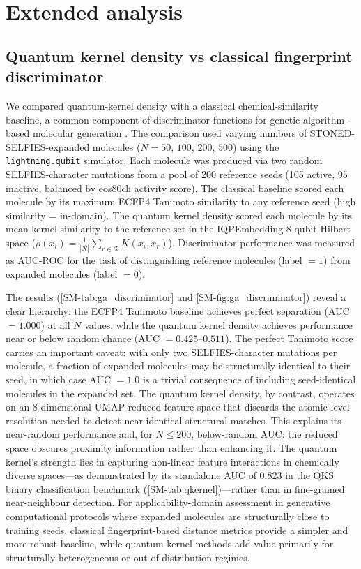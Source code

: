 \documentclass[11pt,a4paper]{article}
\begin{document}
\section{Extended analysis}

\subsection{Quantum kernel density vs classical fingerprint discriminator}


We compared quantum-kernel density with a classical chemical-similarity baseline, a common component of discriminator functions for genetic-algorithm-based molecular generation \citep{jensen2019augmenting}. The comparison used varying numbers of STONED-SELFIES-expanded molecules ($N = 50$, $100$, $200$, $500$) using the \texttt{lightning.qubit} simulator. Each molecule was produced via two random SELFIES-character mutations from a pool of \num{200} reference seeds (\num{105} active, \num{95} inactive, balanced by eos80ch activity score). The classical baseline scored each molecule by its maximum ECFP4 Tanimoto similarity to any reference seed (high similarity = in-domain). The quantum kernel density scored each molecule by its mean kernel similarity to the reference set in the IQPEmbedding 8-qubit Hilbert space ($\rho(x_i) = \frac{1}{|\mathcal{R}|}\sum_{r \in \mathcal{R}} K(x_i, x_r)$). Discriminator performance was measured as AUC-ROC for the task of distinguishing reference molecules (label $= 1$) from expanded molecules (label $= 0$).

The results (\cref{SM-tab:ga_discriminator} and \cref{SM-fig:ga_discriminator}) reveal a clear hierarchy: the ECFP4 Tanimoto baseline achieves perfect separation (AUC $= \num{1.000}$) at all $N$ values, while the quantum kernel density achieves performance near or below random chance (AUC $= \numrange{0.425}{0.511}$). The perfect Tanimoto score carries an important caveat: with only two SELFIES-character mutations per molecule, a fraction of expanded molecules may be structurally identical to their seed, in which case AUC $= \num{1.0}$ is a trivial consequence of including seed-identical molecules in the expanded set. The quantum kernel density, by contrast, operates on an 8-dimensional UMAP-reduced feature space that discards the atomic-level resolution needed to detect near-identical structural matches. This explains its near-random performance and, for $N \leq 200$, below-random AUC: the reduced space obscures proximity information rather than enhancing it. The quantum kernel's strength lies in capturing non-linear feature interactions in chemically diverse spaces---as demonstrated by its standalone AUC of \num{0.823} in the QKS binary classification benchmark (\cref{SM-tab:qkernel})---rather than in fine-grained near-neighbour detection. For applicability-domain assessment in generative computational protocols where expanded molecules are structurally close to training seeds, classical fingerprint-based distance metrics provide a simpler and more robust baseline, while quantum kernel methods add value primarily for structurally heterogeneous or out-of-distribution regimes.
\end{document}
